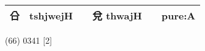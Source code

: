\documentclass[14pt,a4paper]{scrartcl}
\begin{document}
\begin{longtable}[c]{@{}llllll@{}}
\begin{minipage}[t]{0.14\columnwidth}\raggedright\strut
㕣
\strut\end{minipage} &
\begin{minipage}[t]{0.14\columnwidth}\raggedright\strut
tshjwejH
\strut\end{minipage} &
\begin{minipage}[t]{0.14\columnwidth}\raggedright\strut
\strut\end{minipage} &
\begin{minipage}[t]{0.14\columnwidth}\raggedright\strut
兌 thwajH
\strut\end{minipage} &
\begin{minipage}[t]{0.14\columnwidth}\raggedright\strut
\strut\end{minipage} &
\begin{minipage}[t]{0.14\columnwidth}\raggedright\strut
pure:A
\strut\end{minipage}\tabularnewline
\bottomrule
\end{longtable}

(66) 0341 {[}2{]}
\end{document}
